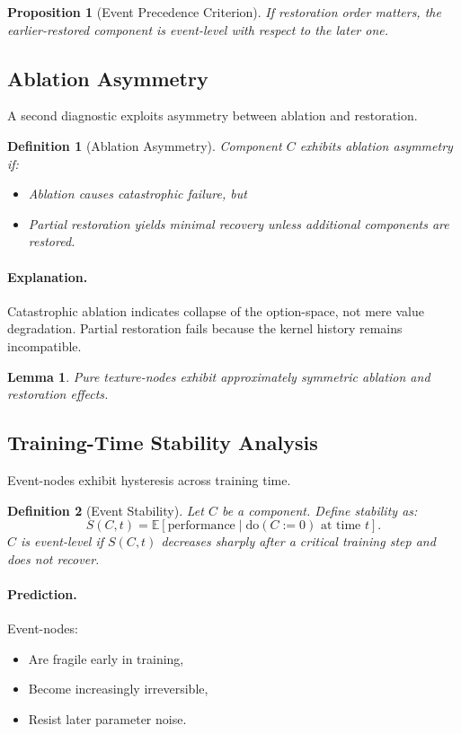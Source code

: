 \documentclass[11pt]{article}
\newtheorem{definition}{Definition}
\newtheorem{lemma}{Lemma}
\newtheorem{proposition}{Proposition}
\theoremstyle{remark}
\newcommand{\Do}{\mathrm{do}}
\begin{document}
\begin{proposition}[Event Precedence Criterion]
If restoration order matters, the earlier-restored component is
event-level with respect to the later one.
\end{proposition}

\subsection{Ablation Asymmetry}

A second diagnostic exploits asymmetry between ablation and restoration.

\begin{definition}[Ablation Asymmetry]
Component $C$ exhibits ablation asymmetry if:
\begin{itemize}
\item Ablation causes catastrophic failure, but
\item Partial restoration yields minimal recovery unless additional
components are restored.
\end{itemize}
\end{definition}

\paragraph{Explanation.}
Catastrophic ablation indicates collapse of the option-space, not mere
value degradation. Partial restoration fails because the kernel history
remains incompatible.

\begin{lemma}
Pure texture-nodes exhibit approximately symmetric ablation and
restoration effects.
\end{lemma}

\subsection{Training-Time Stability Analysis}

Event-nodes exhibit hysteresis across training time.

\begin{definition}[Event Stability]
Let $C$ be a component. Define stability as:
\[
S(C,t) = \mathbb{E}[\text{performance} \mid \Do(C := 0) \text{ at time } t].
\]
$C$ is event-level if $S(C,t)$ decreases sharply after a critical
training step and does not recover.
\end{definition}

\paragraph{Prediction.}
Event-nodes:
\begin{itemize}
\item Are fragile early in training,
\item Become increasingly irreversible,
\item Resist later parameter noise.
\end{itemize}
\end{document}
